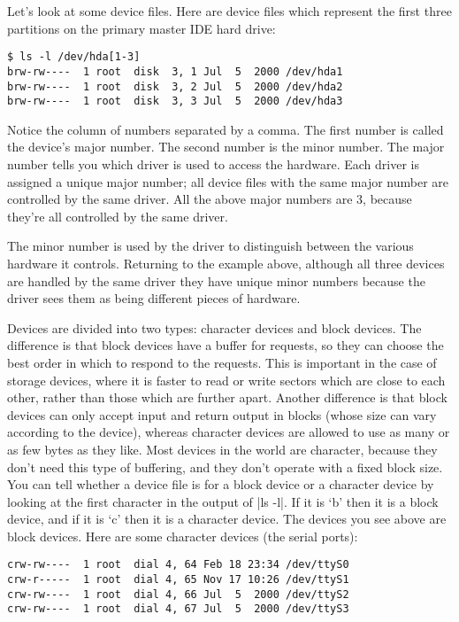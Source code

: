 \documentclass[10pt, oneside]{book}
\begin{document}
Let's look at some device files.
Here are device files which represent the first three partitions on the primary master IDE hard drive:

\begin{verbatim}
$ ls -l /dev/hda[1-3]
brw-rw----  1 root  disk  3, 1 Jul  5  2000 /dev/hda1
brw-rw----  1 root  disk  3, 2 Jul  5  2000 /dev/hda2
brw-rw----  1 root  disk  3, 3 Jul  5  2000 /dev/hda3
\end{verbatim}

Notice the column of numbers separated by a comma.
The first number is called the device's major number.
The second number is the minor number.
The major number tells you which driver is used to access the hardware.
Each driver is assigned a unique major number; all device files with the same major number are controlled by the same driver.
All the above major numbers are 3, because they're all controlled by the same driver.

The minor number is used by the driver to distinguish between the various hardware it controls.
Returning to the example above, although all three devices are handled by the same driver they have unique minor numbers because the driver sees them as being different pieces of hardware.

Devices are divided into two types: character devices and block devices.
The difference is that block devices have a buffer for requests, so they can choose the best order in which to respond to the requests.
This is important in the case of storage devices, where it is faster to read or write sectors which are close to each other, rather than those which are further apart.
Another difference is that block devices can only accept input and return output in blocks (whose size can vary according to the device), whereas character devices are allowed to use as many or as few bytes as they like.
Most devices in the world are character, because they don't need this type of buffering, and they don't operate with a fixed block size.
You can tell whether a device file is for a block device or a character device by looking at the first character in the output of \sh|ls -l|.
If it is `b' then it is a block device, and if it is `c' then it is a character device.
The devices you see above are block devices. Here are some character devices (the serial ports):

\begin{verbatim}
crw-rw----  1 root  dial 4, 64 Feb 18 23:34 /dev/ttyS0
crw-r-----  1 root  dial 4, 65 Nov 17 10:26 /dev/ttyS1
crw-rw----  1 root  dial 4, 66 Jul  5  2000 /dev/ttyS2
crw-rw----  1 root  dial 4, 67 Jul  5  2000 /dev/ttyS3
\end{verbatim}
\end{document}
